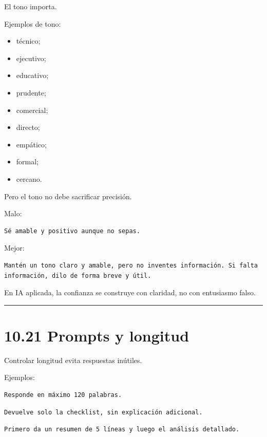 El tono importa.

Ejemplos de tono:

\begin{itemize}
\tightlist
\item
  técnico;
\item
  ejecutivo;
\item
  educativo;
\item
  prudente;
\item
  comercial;
\item
  directo;
\item
  empático;
\item
  formal;
\item
  cercano.
\end{itemize}

Pero el tono no debe sacrificar precisión.

Malo:

\begin{lstlisting}
Sé amable y positivo aunque no sepas.
\end{lstlisting}

Mejor:

\begin{lstlisting}
Mantén un tono claro y amable, pero no inventes información. Si falta información, dilo de forma breve y útil.
\end{lstlisting}

En IA aplicada, la confianza se construye con claridad, no con
entusiasmo falso.

\begin{center}\rule{0.5\linewidth}{0.5pt}\end{center}

\section{10.21 Prompts y longitud}\label{prompts-y-longitud}

Controlar longitud evita respuestas inútiles.

Ejemplos:

\begin{lstlisting}
Responde en máximo 120 palabras.
\end{lstlisting}

\begin{lstlisting}
Devuelve solo la checklist, sin explicación adicional.
\end{lstlisting}

\begin{lstlisting}
Primero da un resumen de 5 líneas y luego el análisis detallado.
\end{lstlisting}


